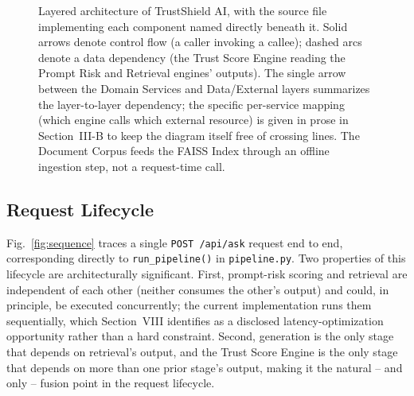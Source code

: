 \documentclass[conference]{IEEEtran}
\begin{document}
\begin{figure}[htbp]
{%
}
\caption{Layered architecture of TrustShield AI, with the source file implementing each
component named directly beneath it. Solid arrows denote control flow (a caller
invoking a callee); dashed arcs denote a data dependency (the Trust Score Engine reading
the Prompt Risk and Retrieval engines' outputs). The single arrow between the Domain
Services and Data/External layers summarizes the layer-to-layer dependency; the specific
per-service mapping (which engine calls which external resource) is given in prose in
Section~III-B to keep the diagram itself free of crossing lines. The Document Corpus
feeds the FAISS Index through an offline ingestion step, not a request-time call.}
\label{fig:architecture}
\end{figure}

\subsection{Request Lifecycle}

Fig.~\ref{fig:sequence} traces a single \texttt{POST /api/ask} request end to end,
corresponding directly to \texttt{run\_pipeline()} in \texttt{pipeline.py}. Two
properties of this lifecycle are architecturally significant. First, prompt-risk
scoring and retrieval are independent of each other (neither consumes the other's
output) and could, in principle, be executed concurrently; the current implementation
runs them sequentially, which Section~VIII identifies as a disclosed latency-optimization
opportunity rather than a hard constraint. Second, generation is the only stage that
depends on retrieval's output, and the Trust Score Engine is the only stage that depends
on more than one prior stage's output, making it the natural -- and only -- fusion point
in the request lifecycle.
\end{document}
